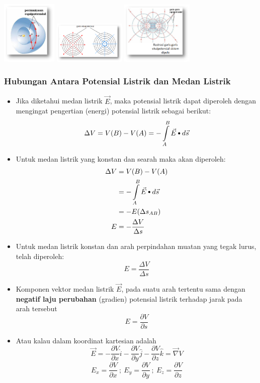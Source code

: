 \documentclass[twocolumn, 11pt]{article}%
\newcommand\sbullet[1][.5]{\mathbin{\ThisStyle{\vcenter{\hbox{%
  \scalebox{#1}{$\SavedStyle\bullet$}}}}}%
}
\begin{document}
     \begin{center}
         \includegraphics[width=100px]{7.png}
         \includegraphics[width=130px]{8.png}
         \includegraphics[width=130px]{9.png}
     \end{center}

     \subsubsection{Hubungan Antara Potensial Listrik dan Medan Listrik}%
     \begin{itemize}
         \item Jika diketahui medan listrik $\vec E$, maka potensial listrik dapat diperoleh dengan mengingat pengertian (energi) potensial listrik sebagai berikut:
             \[ \Delta V=V(B)-V(A)=-\int\limits_A^B \vec E\sbullet[.75] d\vec s\]
         \item Untuk medan listrik yang konstan dan searah maka akan diperoleh:
             \begin{align*}
                 \Delta V&=V(B)-V(A)\\
                         &=-\int\limits_A^B \vec E\sbullet[.75] d\vec s\\
                         &=-E(\Delta s_{AB})\\
                 E&=-\frac{\Delta V}{\Delta s}
             \end{align*}
         \item Untuk medan listrik konstan dan arah perpindahan muatan yang tegak lurus, telah diperoleh:
             \[ E= \frac{\Delta V}{\Delta s} \]
         \item Komponen vektor medan listrik $\vec E$, pada suatu arah tertentu sama dengan \textbf{negatif laju perubahan} (gradien) potensial listrik terhadap jarak pada arah tersebut
             \[E=\frac{\partial V}{\partial s} \]
        \item Atau kalau dalam koordinat kartesian adalah
            \[\vec E=-\frac{\partial V}{\partial x}\hat i - \frac{\partial V}{\partial y}\hat j - \frac{\partial V}{\partial z}\hat k = \vec\nabla V \]
            \[ E_x=\frac{\partial V}{\partial x}\ ;\ E_y=\frac{\partial V}{\partial y}\ ;\ E_z=\frac{\partial V}{\partial z} \]
     \end{itemize}
\end{document}
